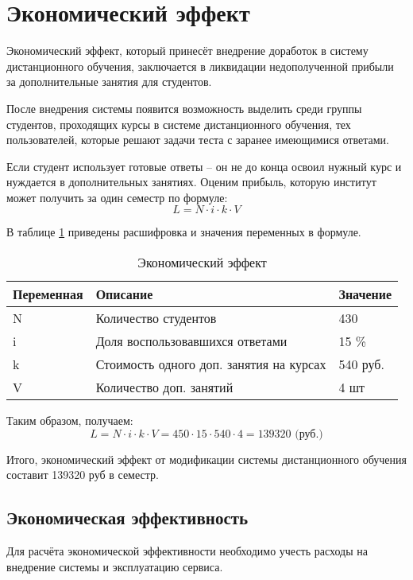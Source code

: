 \section{Экономический эффект}

Экономический эффект, который принесёт внедрение доработок в систему дистанционного обучения, заключается в ликвидации недополученной при\-были за дополнительные занятия для студентов.

После внедрения системы появится возможность выделить среди группы студентов, проходящих курсы в системе дистанционного обучения, тех поль\-зователей, которые решают задачи теста с заранее имеющимися ответами.

Если студент использует  готовые ответы – он не до конца освоил нужный курс и нуждается в дополнительных занятиях. Оценим прибыль, которую институт может получить за один семестр по формуле:
$$
L = N \cdot i \cdot k \cdot V
$$

\newpage
В таблице \ref{profit} приведены расшифровка и значения переменных в формуле.
\begin{table}[H]
\caption{Экономический эффект\label{profit}}
\begin{center}
\begin{tabular}{|p{3.0cm}|p{4.1cm}|p{2.6cm}|}
\hline
Переменная&Описание&Значение\\
\hline
N&Количество студентов &430\\
\hline
i&Доля воспользовавшихся ответами&15 \%\\
\hline
k&Стоимость одного доп. занятия на курсах&540 руб.\\
\hline
V&Количество доп. занятий&4 шт\\
\hline
\end{tabular}
\end{center}
\end{table}

Таким образом, получаем:
$$
L = N \cdot i \cdot k \cdot V = 450 \cdot 15 \cdot 540 \cdot 4 =  139320 \mbox{ (руб.)}
$$

Итого, экономический эффект от модификации системы дистанционного обучения сос\-тавит 139320 руб в семестр.

\subsection{Экономическая эффективность}

Для расчёта экономической эффективности необходимо учесть расходы на внедрение системы и эксплуатацию сервиса.

